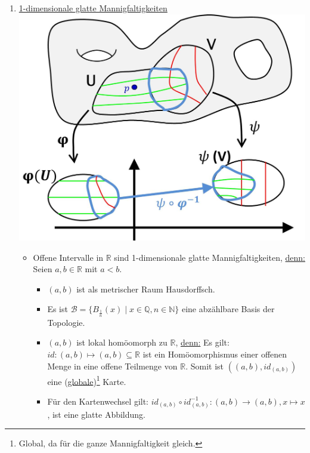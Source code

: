 \documentclass[a4paper,11pt,notitlepage]{report}
\newcommand{\R}{{\ensuremath{\mathbb{R}}}}
\newcommand{\N}{{\ensuremath{\mathbb{N}}}}
\newcommand{\Q}{{\ensuremath{\mathbb{Q}}}}
\begin{document}
\begin{enumerate}
	\item \underline{1-dimensionale glatte Mannigfaltigkeiten} \newline
	\includegraphics[scale=0.4]{images/Kartenwechsel.jpg}
		\begin{itemize}
			\item Offene Intervalle in $\R$ sind 1-dimensionale glatte Mannigfaltigkeiten, \underline{denn:} Seien $a,b \in \R$ mit $a < b$.
			\begin{itemize}
				\item $(a,b)$ ist als metrischer Raum Hausdorffsch.
				\item Es ist $\mathcal{B} = \{B_{\frac{1}{n}}(x) \mid x \in \Q, n \in \N\}$ eine abzählbare Basis der Topologie.
				\item $(a,b)$ ist lokal homöomorph zu $\R$, \underline{denn:} Es gilt: $id \colon (a,b) \mapsto (a,b) \subseteq \R$ ist ein Homöomorphismus einer offenen Menge in eine offene Teilmenge von $\R$. Somit ist $\left((a,b),id_{(a,b)}\right)$ eine (\underline{globale})\footnote{Global, da für die ganze Mannigfaltigkeit gleich.} Karte.
				\item Für den Kartenwechsel gilt: $id_{(a,b)} \circ id_{(a,b)}^{-1} \colon (a,b) \rightarrow (a,b), x \mapsto x$, ist eine glatte Abbildung.
			\end{itemize}
		

\end{itemize}
\end{enumerate}
\end{document}
